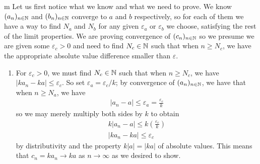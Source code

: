\documentclass[11pt]{article}
\begin{document}
\begin{my proof}{m}
Let us first notice what we know and what we need to prove. We know $(a_n)_{n\in \mathbb{N}}$ and $(b_n)_{n\in \mathbb{N}}$ converge to $a$ and $b$ respectively, so for each of them we have a way to find $N_a$ and $N_b$ for any given $\varepsilon_a$ or $\varepsilon_b$ we choose, satisfying the rest of the limit properties. We are proving convergence of $(c_n)_{n\in \mathbb{N}}$ so we presume we are given some $\varepsilon_c > 0$ and need to find $N_c \in \mathbb{N}$ such that when $n \ge N_c$, we have the appropriate absolute value difference smaller than $\varepsilon$. 
\begin{enumerate}
\item For $\varepsilon_c > 0$, we must find $N_c \in \mathbb{N}$ such that when $n \ge N_c$, we have $|ka_n - k a| \le \varepsilon_c$. So set $\varepsilon_a = \varepsilon_c / k$; by convergence of $(a_n)_{n\in \mathbb{N}}$, we have that when $n \ge N_a$, we have \begin{gather*}
|a_n - a| \le \varepsilon_a = \frac{\varepsilon_c}{k}
\end{gather*}
so we may merely multiply both sides by $k$ to obtain \begin{gather*}
k|a_n - a| \le k \left( \frac{\varepsilon_c}{k}\right) \\
|k a_n - k a| \le \varepsilon_c
\end{gather*}
by distributivity and the property $k |a| = |ka|$ of absolute values. This means that $c_n = k a_n \to k a$ as $n \to \infty$ as we desired to show.


\end{enumerate}
\end{my proof}
\end{document}
